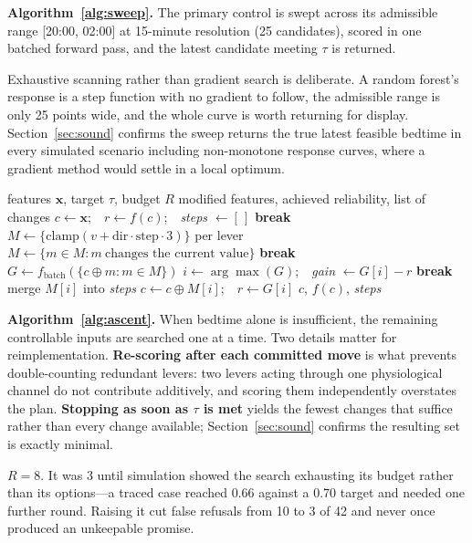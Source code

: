 \documentclass[conference]{IEEEtran}
\begin{document}
\textbf{Algorithm~\ref{alg:sweep}.} The primary control is swept across its
admissible range [20:00, 02:00] at 15-minute resolution (25 candidates), scored
in one batched forward pass, and the latest candidate meeting $\tau$ is
returned.

Exhaustive scanning rather than gradient search is deliberate. A random forest's
response is a step function with no gradient to follow, the admissible range is
only 25 points wide, and the whole curve is worth returning for display.
Section~\ref{sec:sound} confirms the sweep returns the true latest feasible
bedtime in every simulated scenario including non-monotone response curves,
where a gradient method would settle in a local optimum.

\begin{algorithm}[t]
\caption{Greedy coordinate ascent}
\label{alg:ascent}
\begin{algorithmic}[1]
\Require features $\mathbf{x}$, target $\tau$, budget $R$
\Ensure modified features, achieved reliability, list of changes
\State $c \gets \mathbf{x}$;\ \ $r \gets f(c)$;\ \ \textit{steps} $\gets [\,]$
   \textbf{break} \EndIf
  \State $M \gets \{\text{clamp}(v + \text{dir}\cdot\text{step}\cdot 3)\}$ per lever
  \State $M \gets \{m \in M : m\ \text{changes the current value}\}$
   \textbf{break} \EndIf
  \State $G \gets f_{\text{batch}}(\{c \oplus m : m \in M\})$
  \State $i \gets \arg\max(G)$;\ \ \textit{gain} $\gets G[i] - r$
   \textbf{break} \EndIf
  \State merge $M[i]$ into \textit{steps} 
  \State $c \gets c \oplus M[i]$;\ \ $r \gets G[i]$
\EndFor
\State \Return $c$, $f(c)$, \textit{steps}
\end{algorithmic}
\end{algorithm}

\textbf{Algorithm~\ref{alg:ascent}.} When bedtime alone is insufficient, the
remaining controllable inputs are searched one at a time. Two details matter for
reimplementation. \textbf{Re-scoring after each committed move} is what prevents
double-counting redundant levers: two levers acting through one physiological
channel do not contribute additively, and scoring them independently overstates
the plan. \textbf{Stopping as soon as $\tau$ is met} yields the fewest changes
that suffice rather than every change available;
Section~\ref{sec:sound} confirms the resulting set is exactly minimal.

$R = 8$. It was 3 until simulation showed the search exhausting its budget
rather than its options---a traced case reached 0.66 against a 0.70 target and
needed one further round. Raising it cut false refusals from 10 to 3 of 42 and
never once produced an unkeepable promise.
\end{document}
